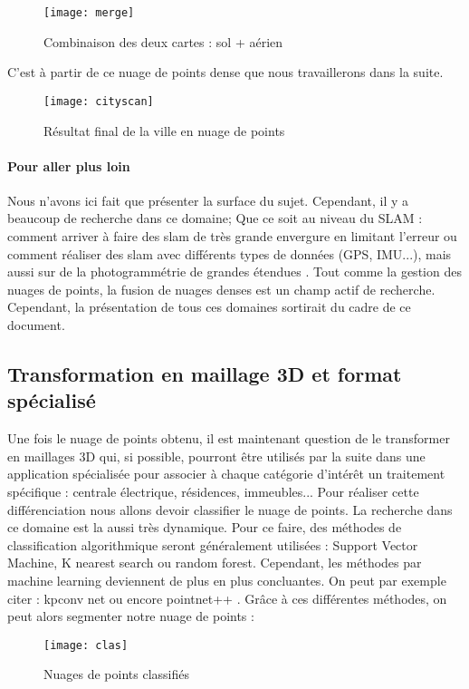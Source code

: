 \begin{figure}[h]
    \centering
    \texttt{[image: merge]}
    \caption{Combinaison des deux cartes : sol + aérien}
    \label{fig:sol}
\end{figure}
\FloatBarrier
C'est à partir de ce nuage de points dense que nous travaillerons dans la suite.
\begin{figure}[h]
    \centering
    \texttt{[image: cityscan]}
    \caption{Résultat final de la ville en nuage de points}
    \label{fig:sol}
\end{figure}
\FloatBarrier

\paragraph{Pour aller plus loin} Nous n'avons ici fait que présenter la surface du sujet. Cependant, il y a beaucoup de recherche dans ce domaine; Que ce soit au niveau du SLAM : comment arriver à faire des slam de très grande envergure en limitant l'erreur \cite{slamLargeScale} ou comment réaliser des slam avec différents types de données (GPS, IMU...), mais aussi sur de la photogrammétrie de grandes étendues \cite{LargeScale}. Tout comme la gestion des nuages de points, la fusion de nuages denses est un champ actif de recherche. Cependant, la présentation de tous ces domaines sortirait du cadre de ce document.

\subsection{Transformation en maillage 3D et format spécialisé}

Une fois le nuage de points obtenu, il est maintenant question de le transformer en maillages 3D qui, si possible, pourront être utilisés par la suite dans une application spécialisée pour associer à chaque catégorie d'intérêt un traitement spécifique : centrale électrique, résidences, immeubles...
\newline
Pour réaliser cette différenciation nous allons devoir classifier le nuage de points. La recherche dans ce domaine est la aussi très dynamique. Pour ce faire, des méthodes de classification algorithmique seront généralement utilisées : Support Vector Machine, K nearest search ou random forest. Cependant, les méthodes par machine learning deviennent de plus en plus concluantes. On peut par exemple citer : kpconv net \cite{thomas2019KPConv} ou encore pointnet++ \cite{qi2017pointnet}.
\newline
Grâce à ces différentes méthodes, on peut alors segmenter notre nuage de points :
\begin{figure}[h]
    \centering
    \texttt{[image: clas]}
    \caption{Nuages de points classifiés}
    \label{fig:sol}
\end{figure}
\FloatBarrier

